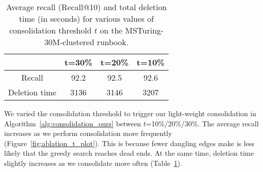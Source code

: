 \begin{table}[h]
\vspace{-10pt}
\begin{tabular}{c|ccc}
\toprule
 & t=30\% & t=20\% & t=10\% \\
\midrule
Recall        & 92.2    & 92.5    & 92.6  \\
Deletion time & 3136   & 3146    & 3207   \\
\bottomrule
\end{tabular}
\caption{Average recall (Recall@10) and total deletion time (in seconds) for various
values of consolidation threshold $t$ on the MSTuring-30M-clustered runbook.
\vspace{-10pt}}
\label{tab:ablation_t_table}
\end{table}

We varied the consolidation threshold to trigger our light-weight consolidation
in Algorithm~\ref{alg:consolidation_ours} between $t$=10\%/20\%/30\%.
The average recall increases as we perform consolidation more frequently (Figure~\ref{fig:ablation_t_plot}).
This is because fewer dangling edges make is less likely that the greedy search reaches dead ends.
At the same time, deletion time slightly increases as we consolidate more often (Table~\ref{tab:ablation_t_table}). 







